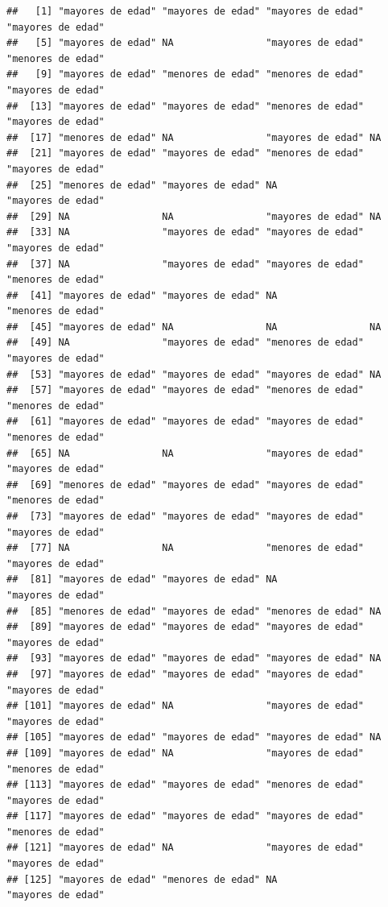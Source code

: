 \documentclass[11pt,]{book}
\begin{document}
\begin{verbatim}
##   [1] "mayores de edad" "mayores de edad" "mayores de edad" "mayores de edad"
##   [5] "mayores de edad" NA                "mayores de edad" "menores de edad"
##   [9] "mayores de edad" "menores de edad" "menores de edad" "mayores de edad"
##  [13] "mayores de edad" "mayores de edad" "menores de edad" "mayores de edad"
##  [17] "menores de edad" NA                "mayores de edad" NA               
##  [21] "mayores de edad" "mayores de edad" "menores de edad" "mayores de edad"
##  [25] "menores de edad" "mayores de edad" NA                "mayores de edad"
##  [29] NA                NA                "mayores de edad" NA               
##  [33] NA                "mayores de edad" "mayores de edad" "mayores de edad"
##  [37] NA                "mayores de edad" "mayores de edad" "menores de edad"
##  [41] "mayores de edad" "mayores de edad" NA                "menores de edad"
##  [45] "mayores de edad" NA                NA                NA               
##  [49] NA                "mayores de edad" "menores de edad" "mayores de edad"
##  [53] "mayores de edad" "mayores de edad" "mayores de edad" NA               
##  [57] "mayores de edad" "mayores de edad" "menores de edad" "menores de edad"
##  [61] "mayores de edad" "mayores de edad" "mayores de edad" "menores de edad"
##  [65] NA                NA                "mayores de edad" "mayores de edad"
##  [69] "menores de edad" "mayores de edad" "mayores de edad" "menores de edad"
##  [73] "mayores de edad" "mayores de edad" "mayores de edad" "mayores de edad"
##  [77] NA                NA                "menores de edad" "mayores de edad"
##  [81] "mayores de edad" "mayores de edad" NA                "mayores de edad"
##  [85] "menores de edad" "mayores de edad" "menores de edad" NA               
##  [89] "mayores de edad" "mayores de edad" "mayores de edad" "mayores de edad"
##  [93] "mayores de edad" "mayores de edad" "mayores de edad" NA               
##  [97] "mayores de edad" "mayores de edad" "mayores de edad" "mayores de edad"
## [101] "mayores de edad" NA                "mayores de edad" "mayores de edad"
## [105] "mayores de edad" "mayores de edad" "mayores de edad" NA               
## [109] "mayores de edad" NA                "mayores de edad" "menores de edad"
## [113] "mayores de edad" "mayores de edad" "menores de edad" "mayores de edad"
## [117] "mayores de edad" "mayores de edad" "mayores de edad" "menores de edad"
## [121] "mayores de edad" NA                "mayores de edad" "mayores de edad"
## [125] "mayores de edad" "menores de edad" NA                "mayores de edad"

\end{verbatim}
\end{document}

